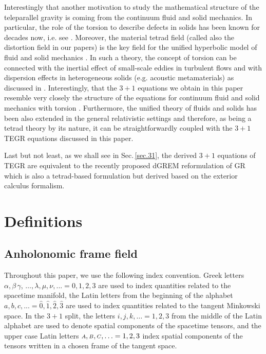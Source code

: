 \documentclass[
10pt, %
a4paper, %
oneside, %
headinclude,footinclude, %
BCOR5mm, %
]{scrartcl}
\newcommand{\sA}{\mathsmaller A}
\newcommand{\sB}{\mathsmaller B}
\newcommand{\sC}{\mathsmaller C}
\begin{document}
Interestingly that another motivation to study the mathematical structure of the teleparallel 
gravity is coming from the continuum fluid and solid mechanics. In particular, the role of the 
torsion to describe defects in solids has been known for decades now, i.e. see 
\cite{VolovichKatanaev1992,Hehl2007,Yavari2012,NguyenLeMarrec2022,Bohmer2020}. Moreover, the 
material
tetrad field (called also the distortion field in our papers) is the key field for the unified 
hyperbolic
model of fluid and solid mechanics \cite{HPR2016,DPRZ2016}. In such a theory, the concept of 
torsion can be connected 
with the inertial effect of small-scale eddies in turbulent flows and with dispersion effects in 
heterogeneous solids (e.g. acoustic metamaterials) as discussed in \cite{Torsion2019}. 
Interestingly, that the $ 3+1 $ equations we obtain in this paper resemble very closely the 
structure of the equations for continuum fluid and solid mechanics with torsion \cite{Torsion2019}. 
Furthermore, the unified theory of fluids and solids has been also extended in the general 
relativistic settings \cite{PTRSA2020} and therefore, as being a tetrad theory by its nature, it 
can be straightforwardly coupled with the $ 3+1 $ TEGR equations discussed in this paper.

Last but not least, as we shall see in Sec.\,\ref{sec.31}, the derived $ 3+1 $ equations of TEGR 
are equivalent to the recently proposed dGREM reformulation of GR 
\cite{Olivares2022} which is also a tetrad-based formulation but derived based on the 
exterior calculus formalism. 

\section{Definitions}

\subsection{Anholonomic frame field}

Throughout this paper, we use the following index convention. Greek letters $ \alpha, 
\beta\,\gamma$, 
$\ldots, \lambda,\mu,\nu,... 
=0,1,2,3
$ are used to index quantities related to the spacetime manifold, the Latin letters from the 
beginning of the alphabet $ a,b,c,... 
=\hat{0},\hat{1},\hat{2},\hat{3}$ are used to index quantities related to the tangent Minkowski 
space.
In the $ 3+1 $ split, the letters $ i,j,k,\ldots =1,2,3$ from the middle of the Latin alphabet are 
used 
to denote spatial components of the spacetime tensors, and the upper case Latin letters $ 
\sA,\sB,\sC,\ldots=1,2,3 $ index spatial components of the tensors written in a chosen frame of the 
tangent space.
\end{document}
